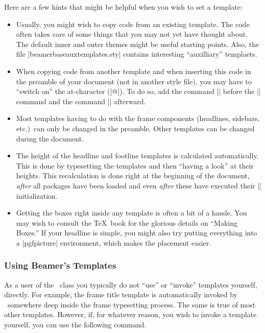 Here are a few hints that might be helpful when you wish to set a
template: 
\begin{itemize}
\item
  Usually, you might wish to copy code from an existing template. The
  code often takes care of some things that you may not yet have
  thought about. The default inner and outer themes might be useful 
  starting points. Also, the file |beamerbaseauxtemplates.sty|
  contains interesting ``auxilliary'' templaets.
\item
  When copying code from another template and when inserting this code
  in the preamble of your document (not in another style file), you may
  have to ``switch on'' the at-character (|@|). To do so, add the
  command |\makeatletter| before the |\setbeamertemplate| command and the
  command |\makeatother| afterward.
\item
  Most templates having to do with the frame components (headlines,
  sidebars, etc.)\ can only be changed in the preamble. Other
  templates can be changed during the document.
\item
  The height of the headline and footline templates is calculated
  automatically. This is done by typesetting the templates and then
  ``having a look'' at their heights. This recalculation is done right
  at the beginning of the document, \emph{after} all packages have
  been loaded and even \emph{after} these have executed their
  |\AtBeginDocument| initialization. 
\item
  Getting the boxes right inside any template is often a bit of a
  hassle. You may wish to consult the \TeX\ book for the glorious
  details on ``Making Boxes.'' If your headline is simple, you might
  also try putting everything into a |pgfpicture| environment, which
  makes the placement easier.
\end{itemize}




\subsubsection{Using Beamer's Templates}

As a user of the \beamer\ class you typically do not ``use'' or
``invoke'' templates yourself, directly. For example, the frame title
template is automatically invoked by \beamer\ somewhere deep inside
the frame typesetting process. The same is true of most other
templates. However, if, for whatever reason, you wish to invoke a
template yourself, you can use the following command.

